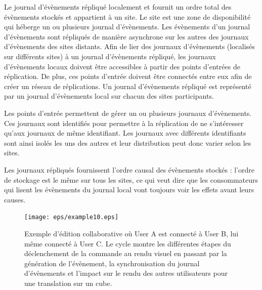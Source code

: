 Le journal d'évènements répliqué localement et fournit un ordre total des 
évènements stockés et appartient à un site. 
Le site est une zone de disponibilité qui héberge un ou plusieurs 
journal d'évènements. Les évènements d'un journal d'évènements sont 
répliqués de manière asynchrone sur les autres des journaux d'évènements 
des sites distants. 
Afin de lier des journaux d'évènements (localisés sur différents sites) à un journal 
d'évènements répliqué, les 
journaux d'évènements locaux doivent être accessibles à partir des points 
d'entrées de réplication. De plus, ces points d'entrée doivent être 
connectés entre eux afin de créer un réseau de réplications. 
Un journal d'évènements répliqué est représenté par un journal d'évènements local 
sur chacun des sites participants.


Les points d'entrée permettent de gérer un ou plusieurs journaux d'évènements. 
Ces journaux sont identifiés pour permettre à la réplication de ne s'intéresser 
qu'aux journaux de même identifiant. 
Les journaux avec différents identifiants sont ainsi isolés les uns des autres et 
leur distribution peut donc varier selon les sites.

Les journaux répliqués fournissent l'ordre causal des évènements stockés : l'ordre 
de stockage est le même sur tous les sites, ce qui veut dire que les 
consommateurs qui lisent les évènements du journal local vont toujours voir les 
effets avant leurs causes.



\begin{figure}[ht]
	\centering
	\texttt{[image: eps/example10.eps]}
	\caption[Flux de la collaboration dans le framework 3DEvent entre 3 
	utilisateurs]{Exemple d'édition collaborative où User A est connecté à User  B, 
	lui 
	même connecté à User C. Le cycle montre les différentes étapes du 
	déclenchement de la commande au rendu visuel en passant par la génération 
	de l'évènement, la 
	synchronisation du journal d'évènements et l'impact sur le rendu des autres 
	utilisateurs pour une translation sur un cube.}\label{fig:cqrs-example}
\end{figure}

